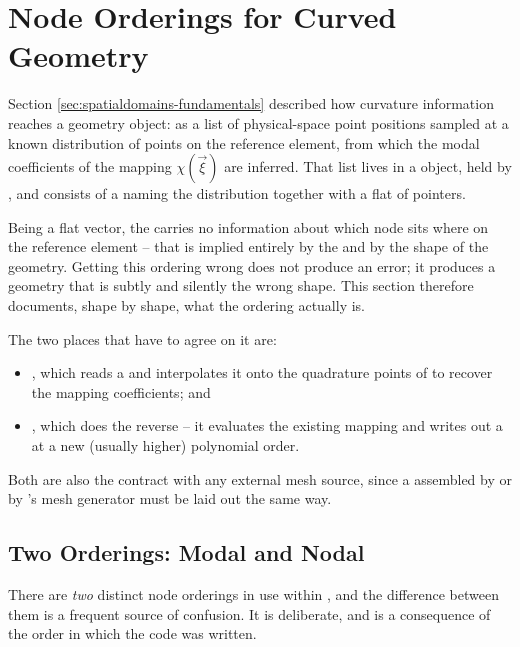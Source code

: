 %
\section{Node Orderings for Curved Geometry}
\label{sec:spatialdomains-orderings}

Section \ref{sec:spatialdomains-fundamentals} described how curvature
information reaches a geometry object: as a list of physical-space point
positions sampled at a known distribution of points on the reference element,
from which the modal coefficients of the mapping $\chi(\vec{\xi})$ are
inferred.  That list lives in a  object, held by
, and consists of a  naming the
distribution together with a flat  of 
pointers.

Being a flat vector, the  carries no information about which node
sits where on the reference element -- that is implied entirely by the
 and by the shape of the geometry.  Getting this ordering
wrong does not produce an error; it produces a geometry that is subtly and
silently the wrong shape.  This section therefore documents, shape by shape,
what the ordering actually is.

The two places that have to agree on it are:

\begin{itemize}
\item {}, which reads a  and interpolates it onto
  the quadrature points of  to recover the mapping
  coefficients; and
\item {}, which does the reverse -- it evaluates the
  existing mapping and writes out a  at a new (usually higher)
  polynomial order.
\end{itemize}

\noindent Both are also the contract with any external mesh source, since a
 assembled by  or by \nek{}'s mesh generator
 must be laid out the same way.

\subsection{Two Orderings: Modal and Nodal}
\label{sec:spatialdomains-orderings-two}

There are \emph{two} distinct node orderings in use within \nek{}, and the
difference between them is a frequent source of confusion.  It is deliberate,
and is a consequence of the order in which the code was written.

